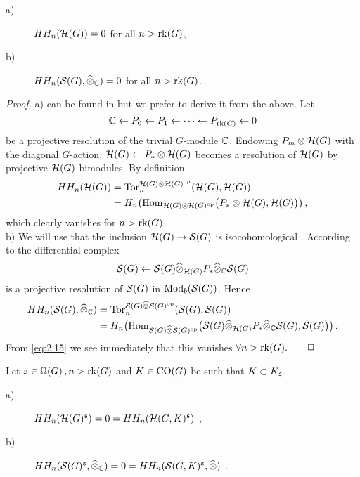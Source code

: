 \begin{lem}\label{lem:2.2}
\begin{description}
\item[a)] $HH_n (\mathcal H (G)) = 0$ for all $n > \mathrm{rk}(G) $,
\item[b)] $HH_n (\mathcal S (G),\widehat{\otimes}_{\mathbb C} ) = 0$ for all $n > \mathrm{rk}(G) $.
\end{description}
\end{lem}
\emph{Proof.} a) can be found in \cite{Nis} but we prefer to
derive it from the above. Let
\begin{equation}\label{eq:2.15}
\mathbb C \leftarrow P_0 \leftarrow P_1 \leftarrow \cdots \leftarrow
P_{\mathrm{rk}(G)} \leftarrow 0
\end{equation}
be a projective resolution of the trivial $G$-module $\mathbb C$.
Endowing $P_m \otimes \mathcal H (G)$ with the diagonal $G$-action,
$\mathcal H (G) \leftarrow P_* \otimes \mathcal H (G)$ becomes a resolution
of $\mathcal H (G)$ by projective $\mathcal H (G)$-bimodules. By definition
\begin{equation}
\begin{split}
HH_n (\mathcal H (G)) & = \mathrm{Tor}_n^{\mathcal H (G) \otimes \mathcal H (G)^\mathrm{op}}
(\mathcal H (G), \mathcal H (G)) \\
& = H_n \big( \mathrm{Hom}_{\mathcal H (G) \otimes \mathcal H (G)^\mathrm{op}} \big(
P_* \otimes \mathcal H (G) , \mathcal H (G) \big) \big) \,,
\end{split}
\end{equation}
which clearly vanishes for $n > \mathrm{rk}(G)$.\\
b) We will use that the inclusion $\mathcal H (G) \to \mathcal S (G)$ is
isocohomological \cite[Theorem 22]{Mey}. According to
\cite[(22)]{Mey} the differential complex
\[
\mathcal S (G) \leftarrow \mathcal S (G) \widehat{\otimes}_{\mathcal H (G)} P_* \widehat{\otimes}_{\mathbb C} \mathcal S (G)
\]
is a projective resolution of $\mathcal S (G)$ in $\mathrm{Mod}_b (\mathcal S (G))$. Hence
\begin{equation}\label{eq:2.5}
\begin{split}
HH_n (\mathcal S (G), \widehat{\otimes}_{\mathbb C} ) & = \mathrm{Tor}_n^{\mathcal S (G)
\widehat{\otimes} \mathcal S (G)^\mathrm{op}} (\mathcal S (G),\mathcal S (G)) \\
& = H_n \big( \mathrm{Hom}_{\mathcal S (G) \widehat{\otimes} \mathcal S (G)^\mathrm{op}} \big( \mathcal S (G) 
\widehat{\otimes}_{\mathcal H (G)} P_* \widehat{\otimes}_{\mathbb C} \mathcal S (G) , \mathcal S (G) \big) \big) \,.
\end{split}
\end{equation}
From \eqref{eq:2.15} we see immediately that this vanishes 
$\forall n > \mathrm{rk}(G). \qquad \Box$
\\[3mm]
\begin{cor}\label{cor:2.3}
Let $\mathfrak s \in \Omega (G)\,, n > \mathrm{rk}(G)$ and $K \in \mathrm{CO}(G)$
be such that $K \subset K_{\mathfrak s}$.
\begin{description}
\item[a)] $HH_n (\mathcal H (G)^{\mathfrak s}) = 0 = HH_n (\mathcal H (G,K)^{\mathfrak s})$ ,
\item[b)] $HH_n (\mathcal S (G)^{\mathfrak s},\widehat{\otimes}_{\mathbb C} ) = 0 =
HH_n (\mathcal S (G,K)^{\mathfrak s},\widehat{\otimes})$ .
\end{description}
\end{cor}
